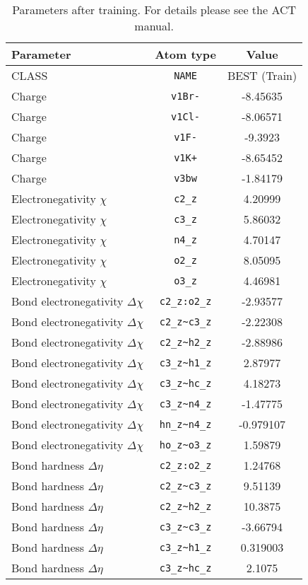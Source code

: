 \begin{table}[ht]
\caption{Parameters after training. For details please see the ACT manual.}
\begin{tabular}{lcc}
\hline
Parameter & Atom type & Value \\ 
\hline
CLASS & \verb^NAME^ & BEST (Train) \\ 
Charge & \verb^v1Br-^ & -8.45635 \\ 
Charge & \verb^v1Cl-^ & -8.06571 \\ 
Charge & \verb^v1F-^ & -9.3923 \\ 
Charge & \verb^v1K+^ & -8.65452 \\ 
Charge & \verb^v3bw^ & -1.84179 \\ 
Electronegativity $\chi$ & \verb^c2_z^ & 4.20999 \\ 
Electronegativity $\chi$ & \verb^c3_z^ & 5.86032 \\ 
Electronegativity $\chi$ & \verb^n4_z^ & 4.70147 \\ 
Electronegativity $\chi$ & \verb^o2_z^ & 8.05095 \\ 
Electronegativity $\chi$ & \verb^o3_z^ & 4.46981 \\ 
Bond electronegativity $\Delta\chi$ & \verb^c2_z:o2_z^ & -2.93577 \\ 
Bond electronegativity $\Delta\chi$ & \verb^c2_z~c3_z^ & -2.22308 \\ 
Bond electronegativity $\Delta\chi$ & \verb^c2_z~h2_z^ & -2.88986 \\ 
Bond electronegativity $\Delta\chi$ & \verb^c3_z~h1_z^ & 2.87977 \\ 
Bond electronegativity $\Delta\chi$ & \verb^c3_z~hc_z^ & 4.18273 \\ 
Bond electronegativity $\Delta\chi$ & \verb^c3_z~n4_z^ & -1.47775 \\ 
Bond electronegativity $\Delta\chi$ & \verb^hn_z~n4_z^ & -0.979107 \\ 
Bond electronegativity $\Delta\chi$ & \verb^ho_z~o3_z^ & 1.59879 \\ 
Bond hardness $\Delta\eta$ & \verb^c2_z:o2_z^ & 1.24768 \\ 
Bond hardness $\Delta\eta$ & \verb^c2_z~c3_z^ & 9.51139 \\ 
Bond hardness $\Delta\eta$ & \verb^c2_z~h2_z^ & 10.3875 \\ 
Bond hardness $\Delta\eta$ & \verb^c3_z~c3_z^ & -3.66794 \\ 
Bond hardness $\Delta\eta$ & \verb^c3_z~h1_z^ & 0.319003 \\ 
Bond hardness $\Delta\eta$ & \verb^c3_z~hc_z^ & 2.1075 \\ 

\end{tabular}
\end{table}

